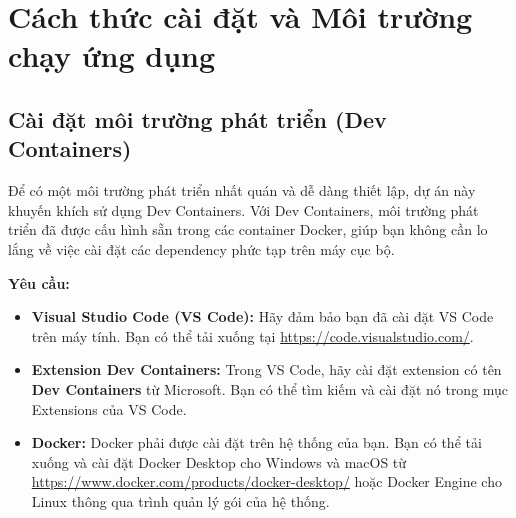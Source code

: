 \chapter{Cách thức cài đặt và Môi trường chạy ứng dụng}
\label{ch:installation}

\section{Cài đặt môi trường phát triển (Dev Containers)}
\label{sec:dev_environment_setup}

Để có một môi trường phát triển nhất quán và dễ dàng thiết lập, dự án này khuyến khích sử dụng Dev Containers. Với Dev Containers, môi trường phát triển đã được cấu hình sẵn trong các container Docker, giúp bạn không cần lo lắng về việc cài đặt các dependency phức tạp trên máy cục bộ.

\textbf{Yêu cầu:}
\begin{itemize}
    \item \textbf{Visual Studio Code (VS Code):} Hãy đảm bảo bạn đã cài đặt VS Code trên máy tính. Bạn có thể tải xuống tại \url{https://code.visualstudio.com/}.
    \item \textbf{Extension Dev Containers:} Trong VS Code, hãy cài đặt extension có tên \textbf{Dev Containers} từ Microsoft. Bạn có thể tìm kiếm và cài đặt nó trong mục Extensions của VS Code.
    \item \textbf{Docker:} Docker phải được cài đặt trên hệ thống của bạn. Bạn có thể tải xuống và cài đặt Docker Desktop cho Windows và macOS từ \url{https://www.docker.com/products/docker-desktop/} hoặc Docker Engine cho Linux thông qua trình quản lý gói của hệ thống.
\end{itemize}

